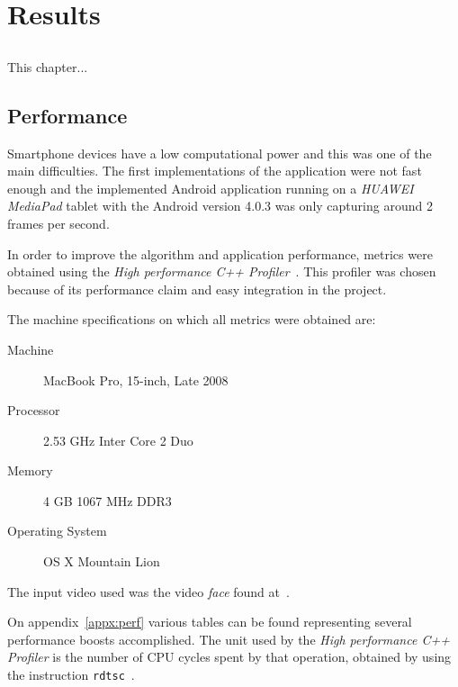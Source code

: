 \chapter{Results} \label{chap:results}

\section*{}


This chapter... %

\section{Performance} \label{sec:results:perf}

Smartphone devices have a low computational power and this was one of the
main difficulties. The first implementations of the application were not
fast enough and the implemented Android application running on a
\emph{HUAWEI MediaPad} tablet with the Android version 4.0.3 was only capturing
around 2 frames per second.

In order to improve the algorithm and application performance, metrics were
obtained using the \emph{High performance C++ Profiler}~\cite{Andrew2013High}.
This profiler was chosen because of its performance claim and easy integration
in the project.

The machine specifications on which all metrics were obtained are:

\begin{description}
  \item[Machine] MacBook Pro, 15-inch, Late 2008
  \item[Processor] 2.53 GHz Inter Core 2 Duo
  \item[Memory] 4 GB 1067 MHz DDR3
  \item[Operating System] OS X Mountain Lion
\end{description}

The input video used was the video \emph{face} found at~\cite{Wu2013Eulerian}.

On appendix~\ref{appx:perf} various tables can be found representing
several performance boosts accomplished. The unit used by the
\emph{High performance C++ Profiler} is the number of CPU cycles spent by
that operation, obtained by using the instruction
\texttt{rdtsc}~\cite{Andrew2013High}.

